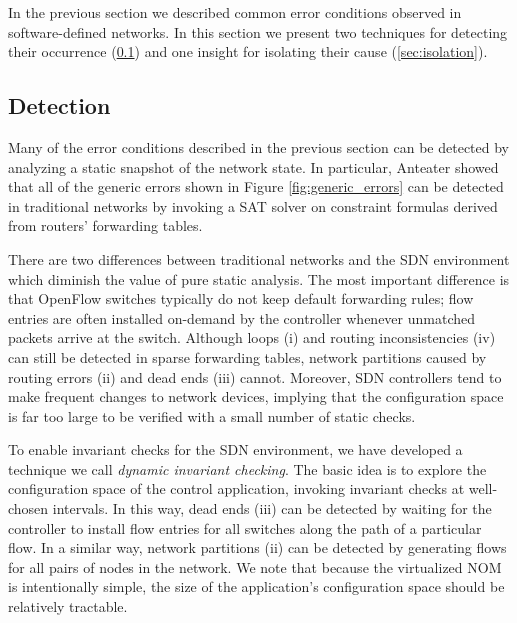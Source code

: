 
In the previous section we described common error conditions observed in
software-defined networks. In this section we present two techniques for
detecting their occurrence (\ref{sec:detection}) and one insight for isolating their cause
(\ref{sec:isolation}).

\subsection{Detection}
\label{sec:detection}

Many of the error conditions described in the previous section can be detected
by analyzing a static snapshot of the network state. In particular, Anteater \cite{anteater}
showed that all of the generic errors shown in Figure
\ref{fig:generic_errors} can be detected in traditional networks by invoking a
SAT solver on constraint formulas derived from routers' forwarding tables.

There are two differences between traditional networks and the SDN environment
which diminish the value of pure static analysis. The most important
difference is that OpenFlow switches typically do not keep default forwarding
rules; flow entries are often installed on-demand by the controller
whenever unmatched packets arrive at the switch. Although loops (i) and
routing inconsistencies (iv) can still be detected in sparse forwarding tables,
network partitions caused by routing errors (ii)
and dead ends (iii) cannot. Moreover, SDN controllers tend to make frequent
changes to network devices, implying that the configuration space is far too
large to be verified with a small number of static checks.

To enable invariant checks for the SDN environment, we have developed a
technique we call {\it dynamic invariant checking}. The basic idea is to
explore the configuration space of the control application, invoking
invariant checks at well-chosen intervals. In this way, dead ends (iii) can be
detected by waiting for the controller to install flow entries for all
switches along the path of a particular flow. In a similar way, network
partitions (ii) can be detected by generating flows for all pairs of nodes in
the network. We note that because the virtualized NOM is intentionally simple,
the size of the application's configuration space should be relatively
tractable.


